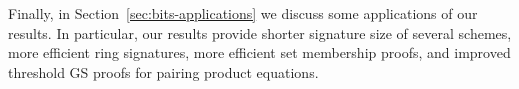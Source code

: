 Finally, in Section~\ref{sec:bits-applications} we discuss some applications of our results.  
In particular, our results provide shorter %
signature size of several schemes,
  more efficient ring signatures,
  more efficient set membership proofs,
  and improved threshold GS proofs for pairing product equations.



